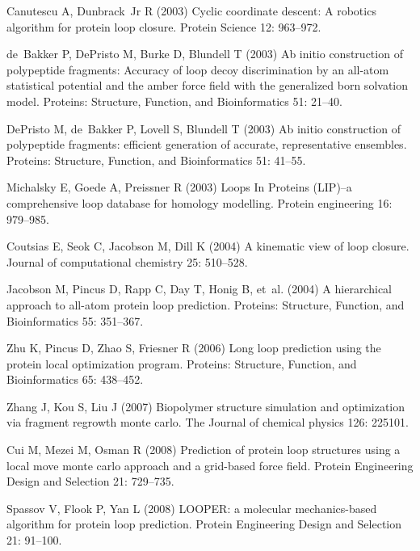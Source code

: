\begin{thebibliography}{10}
Canutescu A, Dunbrack~Jr R (2003) Cyclic coordinate descent: A
robotics
  algorithm for protein loop closure.
\newblock Protein Science 12: 963--972.

de~Bakker P, DePristo M, Burke D, Blundell T (2003) Ab initio
construction of
  polypeptide fragments: Accuracy of loop decoy discrimination by an all-atom
  statistical potential and the amber force field with the generalized born
  solvation model.
\newblock Proteins: Structure, Function, and Bioinformatics 51: 21--40.

DePristo M, de~Bakker P, Lovell S, Blundell T (2003) Ab initio
construction of
  polypeptide fragments: efficient generation of accurate, representative
  ensembles.
\newblock Proteins: Structure, Function, and Bioinformatics 51: 41--55.

Michalsky E, Goede A, Preissner R (2003) Loops {I}n {P}roteins
({LIP})--a
  comprehensive loop database for homology modelling.
\newblock Protein engineering 16: 979--985.

Coutsias E, Seok C, Jacobson M, Dill K (2004) A kinematic view of
loop closure.
\newblock Journal of computational chemistry 25: 510--528.

Jacobson M, Pincus D, Rapp C, Day T, Honig B, et~al. (2004) A
hierarchical
  approach to all-atom protein loop prediction.
\newblock Proteins: Structure, Function, and Bioinformatics 55: 351--367.

Zhu K, Pincus D, Zhao S, Friesner R (2006) Long loop prediction
using the
  protein local optimization program.
\newblock Proteins: Structure, Function, and Bioinformatics 65: 438--452.

Zhang J, Kou S, Liu J (2007) Biopolymer structure simulation and
optimization
  via fragment regrowth monte carlo.
\newblock The Journal of chemical physics 126: 225101.

Cui M, Mezei M, Osman R (2008) Prediction of protein loop structures
using a
  local move monte carlo approach and a grid-based force field.
\newblock Protein Engineering Design and Selection 21: 729--735.

Spassov V, Flook P, Yan L (2008) {LOOPER}: a molecular
mechanics-based
  algorithm for protein loop prediction.
\newblock Protein Engineering Design and Selection 21: 91--100.


\end{thebibliography}

